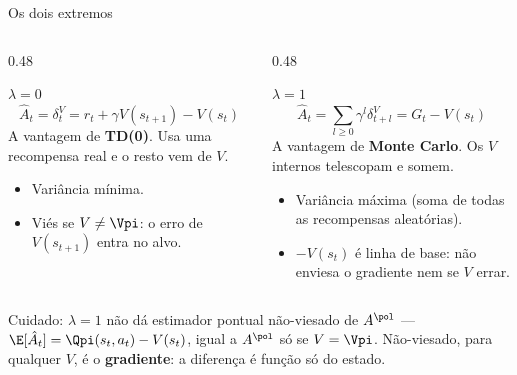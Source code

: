 \documentclass[aspectratio=169, 10pt]{beamer}
\newcommand{\Ahat}{\hat{A}}
\newcommand{\Advpi}{A^{\pol}}
\begin{document}
\begin{frame}{Os dois extremos}

  \begin{columns}[T]
  \begin{column}{0.48\textwidth}
    \begin{teobox}{$\lambda = 0$}
      \[ \Ahat_t = \delta^V_t = r_t + \gamma V(s_{t+1}) - V(s_t) \]
      A vantagem de \textbf{TD(0)}. Usa uma recompensa real e o resto vem de $V$.
      \begin{itemize}\setlength{\itemsep}{0.1ex}
        \item Variância mínima.
        \item \alert{Viés} se $V \ne \Vpi$: o erro de $V(s_{t+1})$ entra no alvo.
      \end{itemize}
    \end{teobox}
  \end{column}
  \begin{column}{0.48\textwidth}
    \begin{teobox}{$\lambda = 1$}
      \[ \Ahat_t = \sum_{l\ge0}\gamma^l\delta^V_{t+l} = G_t - V(s_t) \]
      A vantagem de \textbf{Monte Carlo}. Os $V$ internos telescopam e somem.
      \begin{itemize}\setlength{\itemsep}{0.1ex}
        \item Variância máxima (soma de todas as recompensas aleatórias).
        \item $-V(s_t)$ é linha de base: não enviesa o gradiente nem se $V$ errar.
      \end{itemize}
    \end{teobox}
  \end{column}
  \end{columns}

  \begin{alertabox}
    Cuidado: $\lambda=1$ não dá estimador pontual não-viesado de $\Advpi$ ---
    $\E[\Ahat_t] = \Qpi(s_t,a_t) - V(s_t)$, igual a $\Advpi$ só se $V=\Vpi$. Não-viesado,
    para qualquer $V$, é o \textbf{gradiente}: a diferença é função só do estado.
  \end{alertabox}
\end{frame}
\end{document}
